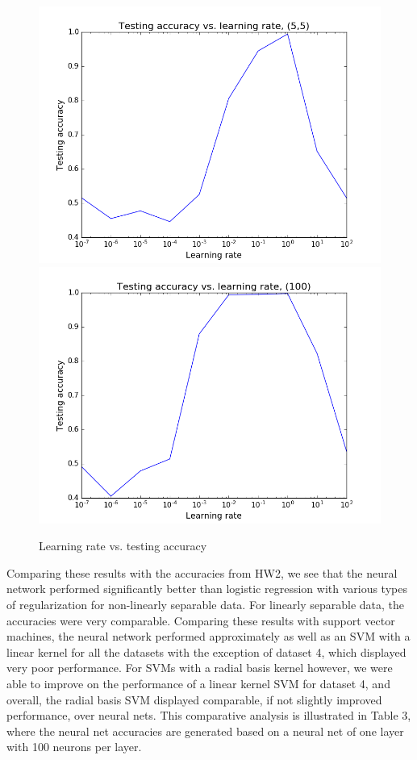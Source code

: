 \documentclass{article}
\begin{document}
\begin{figure}[width=\linewidth]
\centering
\begin{multicols}{2}
  \includegraphics[width=1.2\linewidth]{code/P1/learning_rate_vs_accuracy,(5,5).png}
  \includegraphics[width=1.2\linewidth]{code/P1/learning_rate_vs_accuracy,(100).png}
\end{multicols}
\caption{Learning rate vs. testing accuracy}
\end{figure}

Comparing these results with the accuracies from HW2, we see that the neural network performed significantly better than logistic regression with various types of regularization for non-linearly separable data. For linearly separable data, the accuracies were very comparable. Comparing these results with support vector machines, the neural network performed approximately as well as an SVM with a linear kernel for all the datasets with the exception of dataset 4, which displayed very poor performance. For SVMs with a radial basis kernel however, we were able to improve on the performance of a linear kernel SVM for dataset 4, and overall, the radial basis SVM displayed comparable, if not slightly improved performance, over neural nets. This comparative analysis is illustrated in Table 3, where the neural net accuracies are generated based on a neural net of one layer with 100 neurons per layer.
\end{document}
